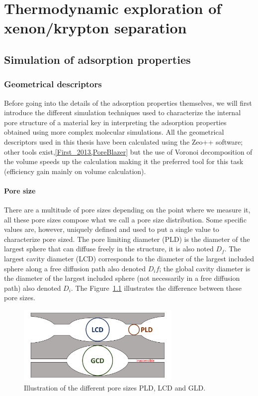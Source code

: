 \documentclass[main.tex]{subfiles}
\begin{document}
\chapter{Thermodynamic exploration of xenon/krypton separation}
\vspace*{-1\baselineskip}

\section{Simulation of adsorption properties}

\subsection{Geometrical descriptors}

Before going into the details of the adsorption properties themselves, we will first introduce the different simulation techniques used to characterize the internal pore structure of a material key in interpreting the adsorption properties obtained using more complex molecular simulations. All the geometrical descriptors used in this thesis have been calculated using the Zeo++ software;\cite{Zeo++} other tools exist,\ref{First_2013,PoreBlazer} but the use of Voronoi decomposition of the volume speeds up the calculation making it the preferred tool for this task (efficiency gain mainly on volume calculation).\cite{Rycroft_2009} 

\subsubsection{Pore size}

There are a multitude of pore sizes depending on the point where we measure it, all these pore sizes  compose what we call a pore size distribution. Some specific values are, however, uniquely defined and used to put a single value to characterize pore sized. The pore limiting diameter (PLD) is the diameter of the largest sphere that can diffuse freely in the structure, it is also noted $D_f$. The largest cavity diameter (LCD) corresponds to the diameter of the largest included sphere along a free diffusion path also denoted $D_if$; the global cavity diameter is the diameter of the largest included sphere (not necessarily in a free diffusion path) also denoted $D_i$. The Figure~\ref{fgr:pore_size} illustrates the difference between these pore sizes. 

\begin{figure}[ht]
  \centering
  \includegraphics[width=0.7\textwidth]{figures/2-thermo/pores.pdf}
  \caption{Illustration of the different pore sizes PLD, LCD and GLD. \todo{}}\label{fgr:pore_size}
\end{figure}
\end{document}
